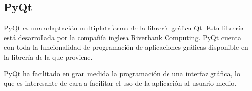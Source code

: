 \subsection*{PyQt}
PyQt es una adaptación multiplataforma de la librería gráfica Qt. Esta librería está desarrollada por la compañía inglesa Riverbank Computing. PyQt cuenta con toda la funcionalidad de programación de aplicaciones gráficas disponible en la librería de la que proviene.

PyQt ha facilitado en gran medida la programación de una interfaz gráfica, lo que es interesante de cara a facilitar el uso de la aplicación al usuario medio.